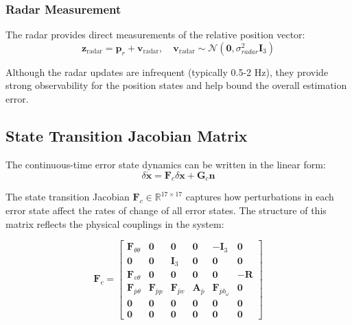\documentclass[11pt,a4paper]{article}
\newcommand{\pr}{\mathbf{p}_r}
\newcommand{\R}{\mathbf{R}}
\newcommand{\I}{\mathbf{I}}
\begin{document}
\subsubsection{Radar Measurement}
The radar provides direct measurements of the relative position vector:
\begin{equation}
    \mathbf{z}_{\text{radar}} = \pr + \mathbf{v}_{\text{radar}}, \quad \mathbf{v}_{\text{radar}} \sim \mathcal{N}(\mathbf{0}, \sigma_{radar}^2 \I_3)
\end{equation}

Although the radar updates are infrequent (typically 0.5-2 Hz), they provide strong observability for the position states and help bound the overall estimation error.

\subsection{State Transition Jacobian Matrix}

The continuous-time error state dynamics can be written in the linear form:
\begin{equation}
    \delta\dot{\mathbf{x}} = \mathbf{F}_c \delta\mathbf{x} + \mathbf{G}_c \mathbf{n}
\end{equation}

The state transition Jacobian $\mathbf{F}_c \in \mathbb{R}^{17 \times 17}$ captures how perturbations in each error state affect the rates of change of all error states. The structure of this matrix reflects the physical couplings in the system:

\begin{equation}
\mathbf{F}_c = \begin{bmatrix}
    \mathbf{F}_{\theta\theta} & \mathbf{0} & \mathbf{0} & \mathbf{0} & -\I_3 & \mathbf{0} \\
    \mathbf{0} & \mathbf{0} & \I_3 & \mathbf{0} & \mathbf{0} & \mathbf{0} \\
    \mathbf{F}_{v\theta} & \mathbf{0} & \mathbf{0} & \mathbf{0} & \mathbf{0} & -\R \\
    \mathbf{F}_{\bar{p}\theta} & \mathbf{F}_{\bar{p}p} & \mathbf{F}_{\bar{p}v} & \mathbf{A}_{\bar{p}} & \mathbf{F}_{\bar{p}b_\omega} & \mathbf{0} \\
    \mathbf{0} & \mathbf{0} & \mathbf{0} & \mathbf{0} & \mathbf{0} & \mathbf{0} \\
    \mathbf{0} & \mathbf{0} & \mathbf{0} & \mathbf{0} & \mathbf{0} & \mathbf{0}
\end{bmatrix}
\label{eq:Fc}
\end{equation}
\end{document}

